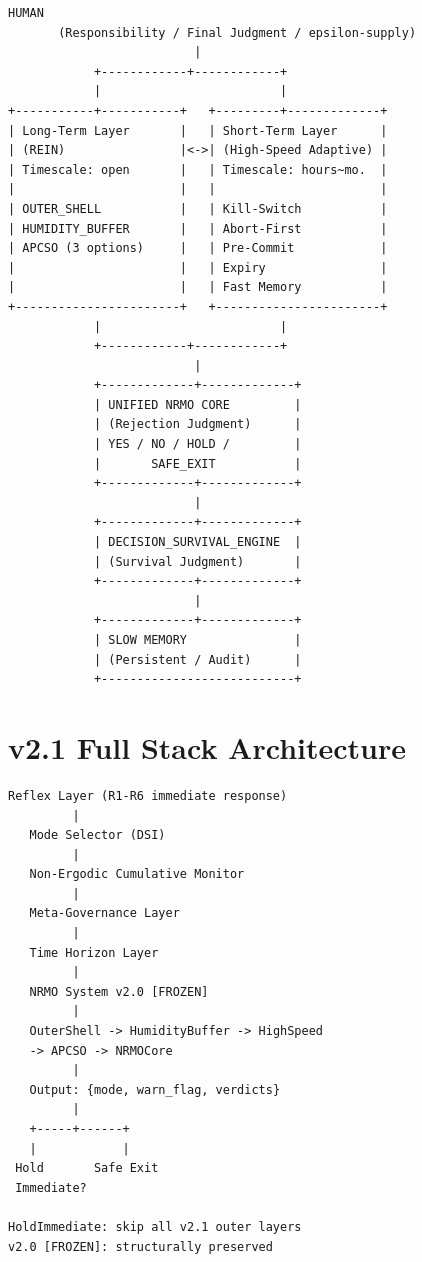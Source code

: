 \begin{lstlisting}[basicstyle=\ttfamily\scriptsize,frame=single]
                        HUMAN
       (Responsibility / Final Judgment / epsilon-supply)
                          |
            +------------+------------+
            |                         |
+-----------+-----------+   +---------+-------------+
| Long-Term Layer       |   | Short-Term Layer      |
| (REIN)                |<->| (High-Speed Adaptive) |
| Timescale: open       |   | Timescale: hours~mo.  |
|                       |   |                       |
| OUTER_SHELL           |   | Kill-Switch           |
| HUMIDITY_BUFFER       |   | Abort-First           |
| APCSO (3 options)     |   | Pre-Commit            |
|                       |   | Expiry                |
|                       |   | Fast Memory           |
+-----------------------+   +-----------------------+
            |                         |
            +------------+------------+
                          |
            +-------------+-------------+
            | UNIFIED NRMO CORE         |
            | (Rejection Judgment)      |
            | YES / NO / HOLD /         |
            |       SAFE_EXIT           |
            +-------------+-------------+
                          |
            +-------------+-------------+
            | DECISION_SURVIVAL_ENGINE  |
            | (Survival Judgment)       |
            +-------------+-------------+
                          |
            +-------------+-------------+
            | SLOW MEMORY               |
            | (Persistent / Audit)      |
            +---------------------------+
\end{lstlisting}

\section{v2.1 Full Stack Architecture}
\label{sec:v21-architecture-diagram}

\begin{lstlisting}[basicstyle=\ttfamily\scriptsize,frame=single]
   Reflex Layer (R1-R6 immediate response)
         |
   Mode Selector (DSI)
         |
   Non-Ergodic Cumulative Monitor
         |
   Meta-Governance Layer
         |
   Time Horizon Layer
         |
   NRMO System v2.0 [FROZEN]
         |
   OuterShell -> HumidityBuffer -> HighSpeed
   -> APCSO -> NRMOCore
         |
   Output: {mode, warn_flag, verdicts}
         |
   +-----+------+
   |            |
 Hold       Safe Exit
 Immediate?

HoldImmediate: skip all v2.1 outer layers
v2.0 [FROZEN]: structurally preserved
\end{lstlisting}

